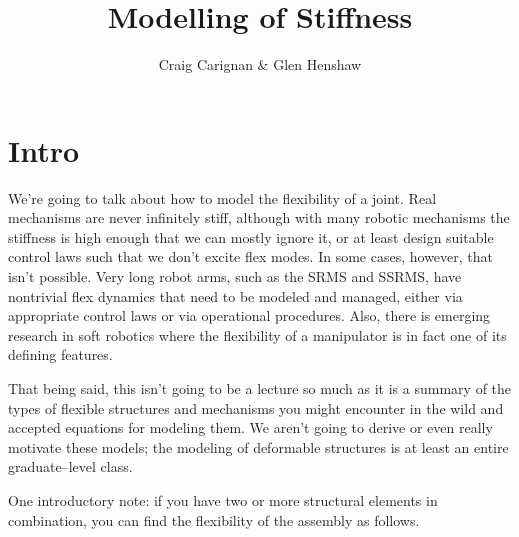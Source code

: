 \documentclass[]{article}
\title{Modelling of Stiffness}
\author{Craig Carignan \& Glen Henshaw}
\begin{document}
\maketitle

\section{Intro}
We're going to talk about how to model the flexibility of a joint. Real mechanisms are never infinitely stiff, although with many robotic mechanisms the stiffness is high enough that we can mostly ignore it, or at least design suitable control laws such that we don't excite flex modes. In some cases, however, that isn't possible. Very long robot arms, such as the SRMS and SSRMS, have nontrivial flex dynamics that need to be modeled and managed, either via appropriate control laws or via operational procedures. Also, there is emerging research in soft robotics where the flexibility of a manipulator is in fact one of its defining features.

That being said, this isn't going to be a lecture so much as it is a summary of the types of flexible structures and mechanisms you might encounter in the wild and accepted equations for modeling them. We aren't going to derive or even really motivate these models; the modeling of deformable structures is at least an entire graduate--level class.

One introductory note: if you have two or more structural elements in combination, you can find the flexibility of the assembly as follows.
\end{document}
